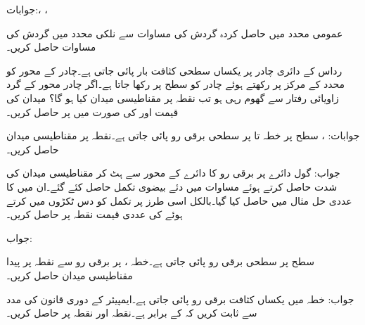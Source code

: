 جوابات:، ، 

عمومی محدد میں حاصل کردہ گردش کی مساوات سے نلکی محدد میں گردش کی مساوات حاصل کریں۔

رداس  کے دائری چادر پر یکساں سطحی کثافت بار  پائی جاتی ہے۔چادر کے محور کو محدد کے مرکز پر رکھتے ہوئے چادر کو سطح  پر رکھا جاتا ہے۔اگر چادر محور کے گرد زاویائی رفتار  سے گھوم رہی ہو تب نقطہ  پر مقناطیسی میدان  کیا ہو گا؟ میدان کی قیمت  اور  کی صورت میں  پر حاصل کریں۔

جوابات: ، 
سطح  پر خطہ  تا  پر سطحی برقی رو  پائی جاتی ہے۔نقطہ  پر مقناطیسی میدان حاصل کریں۔

جواب:
گول دائرے پر برقی رو کا دائرے کے محور سے ہٹ کر مقناطیسی میدان کی شدت حاصل کرتے ہوئے مساوات  میں دئے بیضوی تکمل حاصل کئے گئے۔ان میں  کا عددی حل مثال  میں حاصل کیا گیا۔بالکل اسی طرز پر تکمل کو دس ٹکڑوں میں کرتے ہوئے   کی عددی قیمت نقطہ  پر حاصل کریں۔

جواب:

سطح  پر سطحی برقی رو  پائی جاتی ہے۔خطہ ،  پر برقی رو سے نقطہ  پر پیدا مقناطیسی میدان  حاصل کریں۔

جواب: 
خطہ  میں یکساں کثافت برقی رو  پائی جاتی ہے۔ایمپیئر  کے دوری قانون کی مدد سے ثابت کریں کہ  کے برابر ہے۔نقطہ  اور نقطہ  پر  حاصل کریں۔

